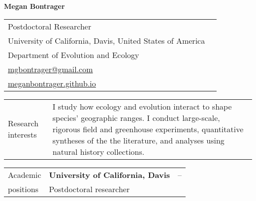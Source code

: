 \documentclass[letterpaper,11pt,oneside]{article}
\begin{document}

\noindent  \LARGE{\textbf{Megan Bontrager}} 

\normalsize

\bigskip

\noindent \begin{tabular}{@{} p{10cm} >{\raggedleft\arraybackslash}p{8.11cm}}
Postdoctoral Researcher \\
University of California, Davis, United States of America & \\
Department of Evolution and Ecology & \\
{\href{mailto:mgbontrager@gmail.com}{mgbontrager@gmail.com}} & \\
{\href{https://meganbontrager.github.io}{meganbontrager.github.io}} & \\

\end{tabular}
\vspace{1em}

\noindent\hrulefill 

\bigskip
\bigskip




\noindent \begin{tabular}{@{} p{3cm} p{13.11cm}}

\Large{Research interests} & I study how ecology and evolution interact to shape species' geographic ranges. I conduct large-scale, rigorous field and greenhouse experiments, quantitative syntheses of the the literature, and analyses using natural history collections. \\

\end{tabular}
\bigskip
\bigskip




\noindent \begin{tabular}{@{} p{3cm} p{10.91cm} >{\raggedleft\arraybackslash}p{1.7cm}}
\Large{Academic}    & \textbf{University of California, Davis} & 2018--\hspace*{0.8cm} \\
\Large{positions}   & Postdoctoral researcher & \\
\end{tabular}
\end{document}
